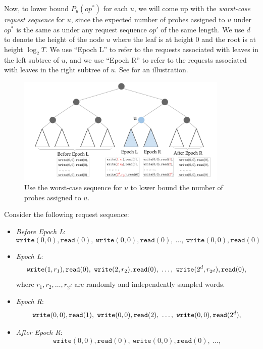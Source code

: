 Now, to lower bound 
$P_{u}(op^*)$ for each $u$, 
we will come up with the {\it worst-case request sequence} for $u$,
since the expected number of probes assigned to $u$ under $op^*$
is the same as 
under any request
sequence $op'$ of the same length.
We use $d$ to denote the height of the node $u$
where the leaf is at height $0$ and 
the root is at height $\log_2 T$. 
We use ``Epoch L'' to refer 
to the requests associated with leaves in the left subtree
of $u$, and we use 
``Epoch R'' to refer to the requests 
associated with leaves in the right subtree of $u$.
See  
for an illustration.

\begin{figure}[t]
\centering
\includegraphics[width=0.9\textwidth]{ln-proof}
\caption{Use the worst-case sequence for $u$ to lower bound
the number of probes assigned to $u$.
}
\label{fig:lnproof}
\end{figure}



Consider the following request sequence:
\begin{itemize}[leftmargin=5mm]
\item 
{\it Before Epoch L}: 
\[\texttt{write}(0, {0}), \texttt{read}(0), \ 
\texttt{write}(0, {0}), \texttt{read}(0), \ 
\ldots, \  \texttt{write}(0, {0}), \texttt{read}(0)\]
\item 
{\it Epoch L}: 
\[\texttt{write}(1, r_1), \texttt{read}(0), \ 
\texttt{write}(2, r_2), \texttt{read}(0), \ 
\ldots,  \ 
\texttt{write}(2^d, r_{2^d}), \texttt{read}(0),\\
\]
where $r_1, r_2, \ldots,  r_{2^d}$
are randomly and independently sampled words. 
\item 
{\it Epoch R}:
\[
\texttt{write}(0, 0), \texttt{read}(1), \ 
\texttt{write}(0, 0), \texttt{read}(2), \ 
\ldots,  \ 
\texttt{write}(0, 0), \texttt{read}(2^d),\\
\]

\item 
{\it After Epoch R}:
\[
\texttt{write}(0, 0), \texttt{read}(0), \ 
\texttt{write}(0, 0), \texttt{read}(0), \ 
\ldots,  
\]
\end{itemize}


